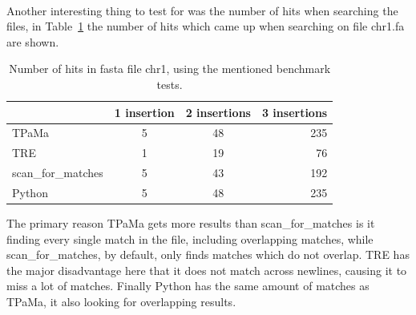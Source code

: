 ~

Another interesting thing to test for was the number of hits when searching the files, in Table~\ref{tab:hits} the number of hits which came up when searching on file chr1.fa are shown.

\begin{table}[h!]
\centering
\begin{tabular}{ l | c c r }
& 1 insertion & 2 insertions & 3 insertions\\
\hline
TPaMa& 5 &  48 & 235 \\
TRE& 1 & 19 & 76 \\
scan\_for\_matches & 5 & 43  & 192 \\
Python & 5 & 48 & 235
\end{tabular}
\caption{Number of hits in fasta file chr1, using the mentioned benchmark tests.}
\label{tab:hits}
\end{table}

The primary reason TPaMa gets more results than scan\_for\_matches is it finding every single match in the file, including overlapping matches, while scan\_for\_matches, by default, only finds matches which do not overlap. TRE has the major disadvantage here that it does not match across newlines, causing it to miss a lot of matches. Finally Python has the same amount of matches as TPaMa, it also looking for overlapping results.